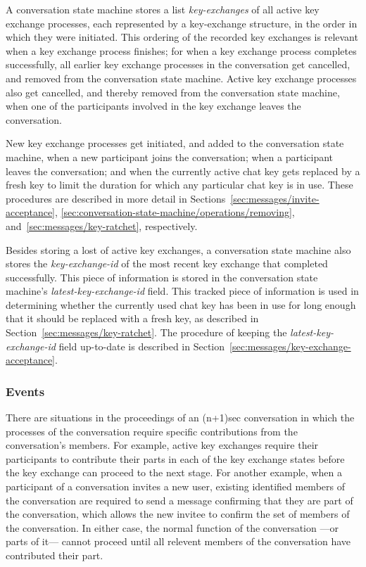 \documentclass{article}
\def\smfield#1{\textsl{#1}}
\def\type#1{\textsf{#1}}
\begin{document}
A conversation state machine stores a list \smfield{key-exchanges} of all active key exchange processes, each represented by a \type{key-exchange} structure, in the order in which they were initiated.
This ordering of the recorded key exchanges is relevant when a key exchange process finishes; for when a key exchange process completes successfully, all earlier key exchange processes in the conversation get cancelled, and removed from the conversation state machine.
Active key exchange processes also get cancelled, and thereby removed from the conversation state machine, when one of the participants involved in the key exchange leaves the conversation.

New key exchange processes get initiated, and added to the conversation state machine, when a new participant joins the conversation; when a participant leaves the conversation; and when the currently active chat key gets replaced by a fresh key to limit the duration for which any particular chat key is in use.
These procedures are described in more detail in Sections~\ref{sec:messages/invite-acceptance}, \ref{sec:conversation-state-machine/operations/removing}, and~\ref{sec:messages/key-ratchet}, respectively.

Besides storing a lost of active key exchanges, a conversation state machine also stores the \smfield{key-exchange-id} of the most recent key exchange that completed successfully.
This piece of information is stored in the conversation state machine's \smfield{latest-key-exchange-id} field.
This tracked piece of information is used in determining whether the currently used chat key has been in use for long enough that it should be replaced with a fresh key, as described in Section~\ref{sec:messages/key-ratchet}.
The procedure of keeping the \smfield{latest-key-exchange-id} field up-to-date is described in Section~\ref{sec:messages/key-exchange-acceptance}.


\subsubsection{Events}
\label{sec:conversation-state-machine/contents/events}

There are situations in the proceedings of an (n+1)sec conversation in which the processes of the conversation require specific contributions from the conversation's members.
For example, active key exchanges require their participants to contribute their parts in each of the key exchange states before the key exchange can proceed to the next stage.
For another example, when a participant of a conversation invites a new user, existing identified members of the conversation are required to send a message confirming that they are part of the conversation, which allows the new invitee to confirm the set of members of the conversation.
In either case, the normal function of the conversation ---or parts of it--- cannot proceed until all relevent members of the conversation have contributed their part.
\end{document}
